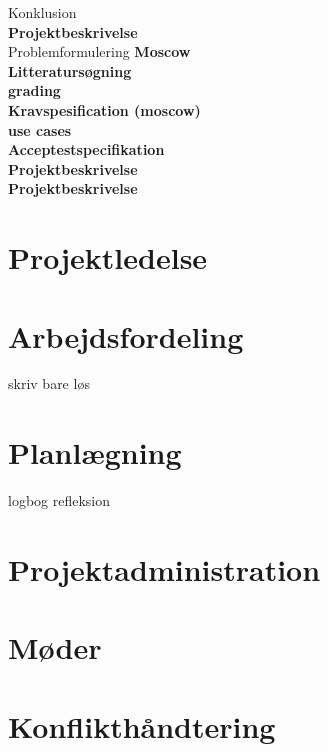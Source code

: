  Konklusion\\
 
 
 
  \textbf{Projektbeskrivelse}\\
  
  Problemformulering
  \textbf{Moscow}\\
  \textbf{Litteratursøgning}\\
  \textbf{grading}\\
  \textbf{Kravspesification (moscow)}\\
  \textbf{use cases}\\
  \textbf{Acceptestspecifikation}\\
  \textbf{Projektbeskrivelse}\\
  \textbf{Projektbeskrivelse}\\
  





















\chapter{Projektledelse}
\chapter{Arbejdsfordeling}
skriv bare løs
\chapter{Planlægning}
logbog
refleksion
\chapter{Projektadministration}
\chapter{Møder}
\chapter{Konflikthåndtering}
